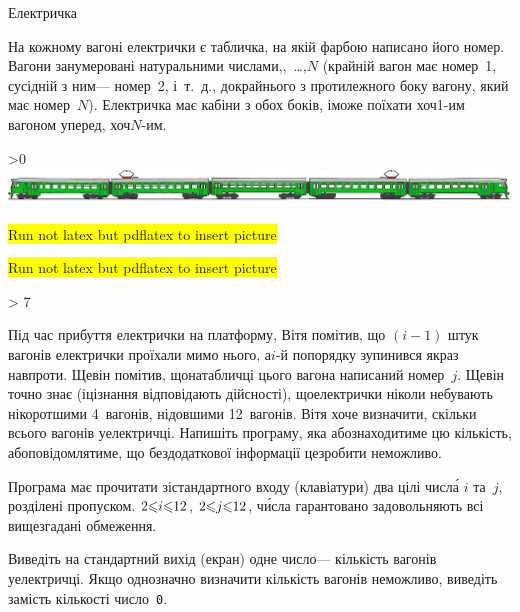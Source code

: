 \begin{problemAllDefault}{Електричка}

На кожному вагоні електрички є табличка, на якій фарбою написано його номер. Вагони занумеровані натуральними числами,,~\dots,\nolinebreak[2] $N$ (крайній вагон має номер~1, сусідній з ним\nolinebreak[3] --- номер~2, і~т.~д., до\nolinebreak[3] крайнього з протилежного боку вагону, який має номер~$N$). Електричка має кабіни з обох боків, і\nolinebreak[3] може поїхати хоч\nolinebreak[2] \mbox{1-им} вагоном уперед, хоч\nolinebreak[3] \mbox{$N$-им}.

\ifnum\pdfoutput>0
\includegraphics[width=\textwidth,keepaspectratio=true]{elTrain.png}
\else
\begin{tiny}\colorbox{yellow}{Run not latex but pdflatex to insert picture}\par\end{tiny}
\begin{small}\colorbox{yellow}{Run not latex but pdflatex to insert picture}\end{small}
\ifnum\number\month > 7 \ERROR {}\fi
\fi

Під час прибуття електрички на платформу, Вітя помітив, що ${(i{-}1)}$ штук вагонів електрички проїхали мимо нього, а\nolinebreak[2] \mbox{$i$-й} по\nolinebreak[2] порядку зупинився якраз навпроти. Ще\nolinebreak[2] він помітив, що\nolinebreak[2] на\nolinebreak[2] табличці цього вагона написаний номер~$j$. Ще\nolinebreak[2] він точно знає (і\nolinebreak[2] ці\nolinebreak[2] знання відповідають дійсності), що\nolinebreak[2] електрички ніколи не\nolinebreak[3] бувають ні\nolinebreak[3] коротшими 4~вагонів, ні\nolinebreak[3] довшими 12~вагонів. Вітя хоче визначити, скільки всього вагонів у\nolinebreak[2] електричці. Напишіть програму, яка або\nolinebreak[2] знаходитиме цю кількість, або\nolinebreak[2] повідомлятиме, що без\nolinebreak[1] додаткової інформації це\nolinebreak[1] зробити неможливо.

\InputFile
Програма має прочитати зі\nolinebreak[3] стандартного входу (клавіатури) два цілі числ\'{а} $i$ та~$j$, розділені пропуском. ${2{\leqslant}i{\leqslant}12}$, ${2{\leqslant}j{\leqslant}12}$, ч\'{и}сла гарантовано задовольняють всі вищезгадані обмеження.

\OutputFile
Виведіть на стандартний вихід (екран) одне число\nolinebreak[3] --- кількість вагонів у\nolinebreak[3] електричці. Якщо однозначно визначити кількість вагонів неможливо, виведіть замість кількості число~\texttt{0}.

\Example
\begin{exampleSimple}{3em}{3em}%
%
\end{exampleSimple}

\end{problemAllDefault}
